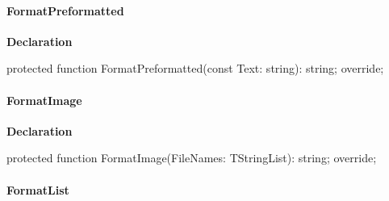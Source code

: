 \documentclass{report}
\newif\ifpdf
\begin{document}
\paragraph*{FormatPreformatted}\hspace*{\fill}

\label{PasDoc_GenLatex.TTexDocGenerator-FormatPreformatted}
\begin{list}{}{
\setlength{\itemindent}{0cm}
\setlength{\listparindent}{0cm}
\setlength{\leftmargin}{\evensidemargin}
\addtolength{\leftmargin}{\tmplength}
\settowidth{\labelsep}{X}
\addtolength{\leftmargin}{\labelsep}
\setlength{\labelwidth}{\tmplength}
}
\item[\textbf{Declaration}\hfill]
\ifpdf
\begin{flushleft}
\fi
\begin{ttfamily}
protected function FormatPreformatted(const Text: string): string; override;\end{ttfamily}

\ifpdf
\end{flushleft}
\fi

\end{list}
\paragraph*{FormatImage}\hspace*{\fill}

\label{PasDoc_GenLatex.TTexDocGenerator-FormatImage}
\begin{list}{}{
\setlength{\itemindent}{0cm}
\setlength{\listparindent}{0cm}
\setlength{\leftmargin}{\evensidemargin}
\addtolength{\leftmargin}{\tmplength}
\settowidth{\labelsep}{X}
\addtolength{\leftmargin}{\labelsep}
\setlength{\labelwidth}{\tmplength}
}
\item[\textbf{Declaration}\hfill]
\ifpdf
\begin{flushleft}
\fi
\begin{ttfamily}
protected function FormatImage(FileNames: TStringList): string; override;\end{ttfamily}

\ifpdf
\end{flushleft}
\fi

\end{list}
\paragraph*{FormatList}\hspace*{\fill}
\end{document}
